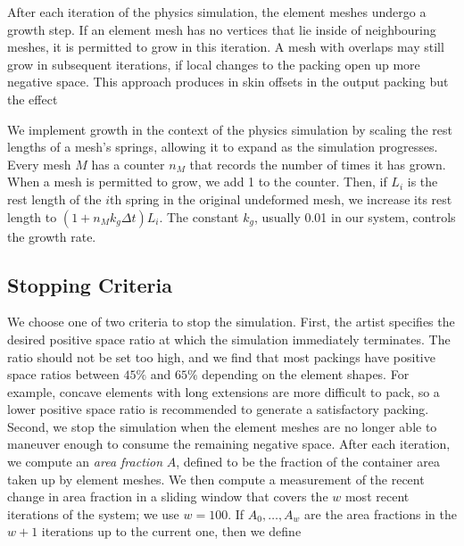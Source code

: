 After each iteration of the physics simulation, the element meshes undergo
a growth step.  If an element mesh has no vertices that lie inside of
neighbouring meshes, it is permitted to grow in this iteration.  A mesh with
overlaps may still grow in subsequent iterations, if local changes to the 
packing open up more negative space.
This approach produces  in skin offsets in the output packing
but the effect 

We implement growth in the context of the physics simulation by scaling
the rest lengths of a mesh's springs, allowing it to expand as the simulation
progresses.  Every mesh $M$ has a counter $n_M$ that records the number of
times it has grown.  When a mesh is permitted
to grow, we add 1 to the counter.  Then, if $L_i$ is the rest length
of the $i$th spring in the original undeformed mesh, we increase its rest
length to $(1+n_Mk_g\Delta t)L_i$.  The constant $k_g$,
usually 0.01 in our system, controls the growth rate.


\subsection{Stopping Criteria}
\label{repulsionpak_stopping_criteria}


We choose one of two criteria to stop the simulation. First, the artist specifies 
the desired positive space ratio at which the simulation immediately terminates.
The ratio should not be set too high, and
we find that most packings have positive space ratios between $45\%$ and $65\%$ depending on the element shapes.
For example, concave elements with long extensions are more difficult to pack, 
so a lower positive space ratio is recommended to generate a satisfactory packing.
Second, we stop the simulation when the element meshes are no longer
able to maneuver enough to consume the remaining negative space. 
After each iteration, we compute an \textit{area fraction} $A$, defined to be the fraction of
the container area taken up by element meshes.  We then compute a measurement
of the recent change in area fraction in a sliding window that covers the $w$
most recent iterations of the system; we use $w=100$.  If $A_0,\ldots,A_w$
are the area fractions in the $w+1$ iterations up to the current one, then we
define

